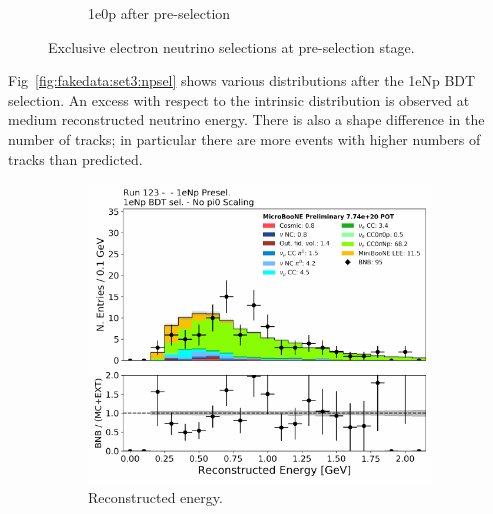 \begin{figure}[H]
\begin{center}
\begin{subfigure}[b]{0.45\textwidth}
    \caption{\label{fig:fakedata:set3:2shr0p} 1e0p after pre-selection}
    \end{subfigure}
\caption{\label{fig:fakedata:set3:presel} Exclusive electron neutrino selections at pre-selection stage.}
\end{center}
\end{figure}

Fig~\ref{fig:fakedata:set3:npsel} shows various distributions after the 1eNp BDT selection.  An excess with respect to the \nue intrinsic distribution is observed at medium reconstructed neutrino energy. There is also a shape difference in the number of tracks; in particular there are more events with higher numbers of tracks than predicted. 

\begin{figure}[H] 
\begin{center}
    \begin{subfigure}[b]{0.45\textwidth}
    \centering
    \includegraphics[width=1.00\textwidth]{Fakedata/set3/Np_postsel_recoe.pdf}
    \caption{\label{fig:fakedata:set3:Np_postsel_recoe} Reconstructed energy.}
    \end{subfigure}
    \begin{subfigure}[b]{0.45\textwidth}
    \centering

\end{subfigure}
\end{center}
\end{figure}
